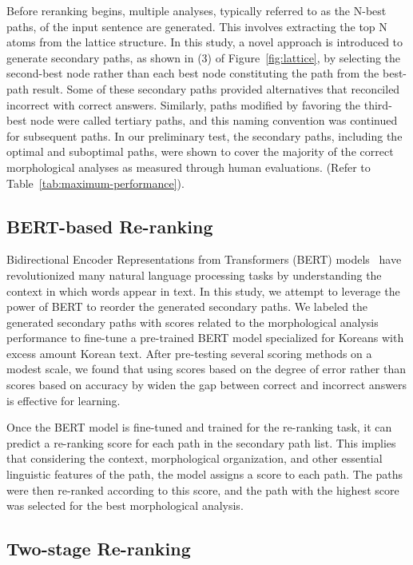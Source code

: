 \documentclass[AMS,STIX2COL]{WileyNJD-v2}
\begin{document}
    Before reranking begins, multiple analyses, typically referred to as the N-best paths, of the input sentence are generated.
    This involves extracting the top N atoms from the lattice structure.
    In this study, a novel approach is introduced to generate secondary paths, as shown in (3) of Figure~\ref{fig:lattice}, by selecting the second-best node rather than each best node constituting the path from the best-path result.
    Some of these secondary paths provided alternatives that reconciled incorrect with correct answers.
    Similarly, paths modified by favoring the third-best node were called tertiary paths, and this naming convention was continued for subsequent paths.
    In our preliminary test, the secondary paths, including the optimal and suboptimal paths, were shown to cover the majority of the correct morphological analyses as measured through human evaluations.
    (Refer to Table~\ref{tab:maximum-performance}).

    \subsection{BERT-based Re-ranking}\label{subsec:bert-based-reranking}

    Bidirectional Encoder Representations from Transformers (BERT) models~\cite{Devlin2019} have revolutionized many natural language processing tasks by understanding the context in which words appear in text.
    In this study, we attempt to leverage the power of BERT to reorder the generated secondary paths.
    We labeled the generated secondary paths with scores related to the morphological analysis performance to fine-tune a pre-trained BERT model specialized for Koreans with excess amount Korean text.
    After pre-testing several scoring methods on a modest scale, we found that using scores based on the degree of error rather than scores based on accuracy by widen the gap between correct and incorrect answers is effective for learning.

    Once the BERT model is fine-tuned and trained for the re-ranking task, it can predict a re-ranking score for each path in the secondary path list.
    This implies that considering the context, morphological organization, and other essential linguistic features of the path, the model assigns a score to each path.
    The paths were then re-ranked according to this score, and the path with the highest score was selected for the best morphological analysis.

    \subsection{Two-stage Re-ranking}\label{subsec:two-stage-reranking}
\end{document}
